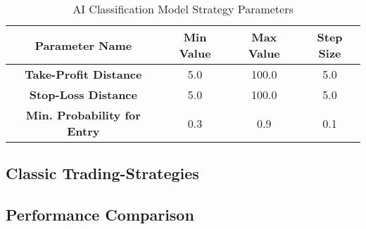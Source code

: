 \begin{table}[H]
    \centering
    \begin{tabular}{cccc}
        \toprule
        Parameter Name & Min Value & Max Value & Step Size
        \\
        \midrule
        \textbf{Take-Profit Distance}       & 5.0 & 100.0 & 5.0 \\
        \textbf{Stop-Loss Distance}         & 5.0 & 100.0 & 5.0 \\
        \textbf{Min. Probability for Entry} & 0.3 & 0.9   & 0.1 \\
        \bottomrule
    \end{tabular}
    \caption{AI Classification Model Strategy Parameters}
    \label{tbl:classification-strategy-parameters}
\end{table}

\subsection{Classic Trading-Strategies}

\subsection{Performance Comparison}

